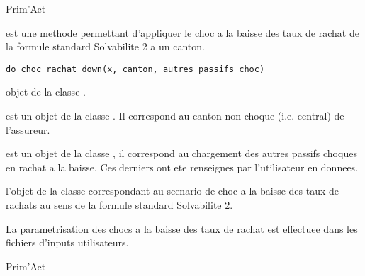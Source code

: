 \documentclass[a4paper]{book}
\begin{document}
%
\begin{Author}\relax
Prim'Act
\end{Author}
%
\begin{Description}\relax
{} est une methode permettant d'appliquer le choc a la baisse des taux de rachat de la formule standard Solvabilite 2 a un canton.
\end{Description}
%
\begin{Usage}
\begin{verbatim}
do_choc_rachat_down(x, canton, autres_passifs_choc)
\end{verbatim}
\end{Usage}
%
\begin{Arguments}
\begin{ldescription}
\item[\code{x}] objet de la classe .

\item[\code{canton}] est un objet de la classe . Il correspond au canton non choque (i.e. central)
de l'assureur.

\item[\code{autres\_passifs\_choc}] est un objet de la classe , il correspond au chargement
des autres passifs choques en rachat a la baisse.
Ces derniers ont ete renseignes par l'utilisateur en donnees.
\end{ldescription}
\end{Arguments}
%
\begin{Value}
 l'objet  de la classe  correspondant au scenario de choc a la baisse
des taux de rachats au sens de la formule standard Solvabilite 2.
\end{Value}
%
\begin{Note}\relax
La parametrisation des chocs a la baisse des taux de rachat est effectuee dans les fichiers d'inputs
utilisateurs.
\end{Note}
%
\begin{Author}\relax
Prim'Act
\end{Author}
\end{document}
